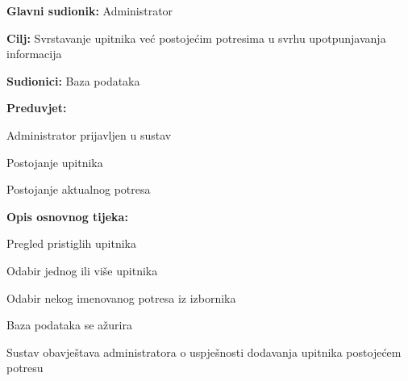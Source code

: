 					\noindent {}
					\begin{packed_item}
	
						\item \textbf{Glavni sudionik:} Administrator
						\item \textbf{Cilj:} Svrstavanje upitnika već postojećim potresima u svrhu upotpunjavanja informacija
						\item \textbf{Sudionici:} Baza podataka
						\item \textbf{Preduvjet:} 
						\begin{packed_item}
							\item Administrator prijavljen u sustav
							\item Postojanje upitnika
							\item Postojanje aktualnog potresa
						\end{packed_item}

						\item \textbf{Opis osnovnog tijeka:}
						
						\item[] \begin{packed_enum}
	
							\item Pregled pristiglih upitnika
							\item Odabir jednog ili više upitnika
							\item Odabir nekog imenovanog potresa iz izbornika
							\item Baza podataka se ažurira
							\item Sustav obavještava administratora o uspješnosti dodavanja upitnika postojećem potresu
							
						\end{packed_enum}
					\end{packed_item}

